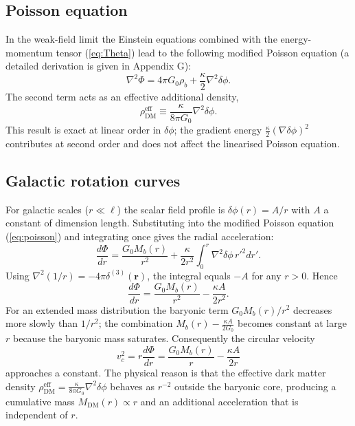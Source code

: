 \documentclass[12pt,a4paper]{article}
\begin{document}
	\subsection{Poisson equation}
	In the weak-field limit the Einstein equations combined with the energy-momentum tensor (\ref{eq:Theta}) lead to the following modified Poisson equation (a detailed derivation is given in Appendix G):
	\begin{equation}
		\nabla^2 \Phi = 4\pi G_0 \rho_b + \frac{\kappa}{2} \nabla^2 \delta\phi.
		\label{eq:poisson}
	\end{equation}
	The second term acts as an effective additional density,
	\begin{equation}
		\rho_{\mathrm{DM}}^{\mathrm{eff}} \equiv \frac{\kappa}{8\pi G_0} \nabla^2 \delta\phi.
		\label{eq:rhoDM}
	\end{equation}
	This result is exact at linear order in \(\delta\phi\); the gradient energy \(\frac{\kappa}{2}(\nabla\delta\phi)^2\) contributes at second order and does not affect the linearised Poisson equation.
	
	\subsection{Galactic rotation curves}
	For galactic scales (\(r \ll \ell\)) the scalar field profile is \(\delta\phi(r) = A/r\) with \(A\) a constant of dimension length. Substituting into the modified Poisson equation (\ref{eq:poisson}) and integrating once gives the radial acceleration:
	\[
	\frac{d\Phi}{dr} = \frac{G_0 M_b(r)}{r^2} + \frac{\kappa}{2r^2} \int_0^r \nabla^2\delta\phi \, r'^2 dr'.
	\]
	Using \(\nabla^2(1/r) = -4\pi\delta^{(3)}(\mathbf{r})\), the integral equals \(-A\) for any \(r>0\). Hence
	\[
	\frac{d\Phi}{dr} = \frac{G_0 M_b(r)}{r^2} - \frac{\kappa A}{2r^2}.
	\]
	For an extended mass distribution the baryonic term \(G_0 M_b(r)/r^2\) decreases more slowly than \(1/r^2\); the combination \(M_b(r) - \frac{\kappa A}{2G_0}\) becomes constant at large \(r\) because the baryonic mass saturates. Consequently the circular velocity
	\[
	v_c^2 = r\frac{d\Phi}{dr} = \frac{G_0 M_b(r)}{r} - \frac{\kappa A}{2r}
	\]
	approaches a constant. The physical reason is that the effective dark matter density \(\rho_{\mathrm{DM}}^{\mathrm{eff}} = \frac{\kappa}{8\pi G_0} \nabla^2\delta\phi\) behaves as \(r^{-2}\) outside the baryonic core, producing a cumulative mass \(M_{\mathrm{DM}}(r) \propto r\) and an additional acceleration that is independent of \(r\).
	
\end{document}
